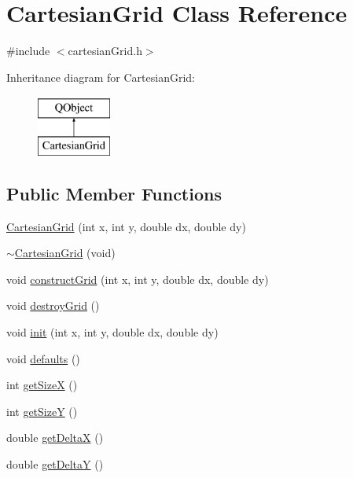\hypertarget{class_cartesian_grid}{\section{Cartesian\+Grid Class Reference}
\label{class_cartesian_grid}
}


{\ttfamily \#include $<$cartesian\+Grid.\+h$>$}

Inheritance diagram for Cartesian\+Grid\+:\begin{figure}[H]
\begin{center}
\leavevmode
\includegraphics[height=2.000000cm]{class_cartesian_grid}
\end{center}
\end{figure}
\subsection*{Public Member Functions}
\begin{DoxyCompactItemize}
\item 
\hyperlink{class_cartesian_grid_a6d38240514f179ef0b9e88f821841aff}{Cartesian\+Grid} (int x, int y, double dx, double dy)
\item 
\hyperlink{class_cartesian_grid_aabcd0a2667fb54c3136b1aaf2d5a622a}{$\sim$\+Cartesian\+Grid} (void)
\item 
void \hyperlink{class_cartesian_grid_a60fde463ac2d4352420414cc3fb2b519}{construct\+Grid} (int x, int y, double dx, double dy)
\item 
void \hyperlink{class_cartesian_grid_a26c1bb3be5feca0f501d901000f2bbb4}{destroy\+Grid} ()
\item 
void \hyperlink{class_cartesian_grid_a8d23d0e85d3ee74135c9cf78866f45d2}{init} (int x, int y, double dx, double dy)
\item 
void \hyperlink{class_cartesian_grid_a2014b2b34c0f581f564bcbd1038d8d77}{defaults} ()
\item 
int \hyperlink{class_cartesian_grid_a7eaaf8b8392435eb7ae4bd2ce3fb0a96}{get\+Size\+X} ()
\item 
int \hyperlink{class_cartesian_grid_a18e5aa40e8b9cd1871110dc1746400b8}{get\+Size\+Y} ()
\item 
double \hyperlink{class_cartesian_grid_a2bd697548627bcc8b757bd826cd1b04f}{get\+Delta\+X} ()
\item 
double \hyperlink{class_cartesian_grid_a453f1749ef1027a4f4aa9c426bfd8cfb}{get\+Delta\+Y} ()
\end{DoxyCompactItemize}

